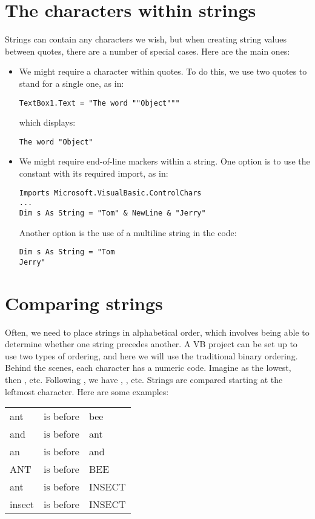	\section{The characters within strings}
		Strings can contain any characters we wish, but when creating string values between quotes, there are a number of special cases. Here are the main ones:
		\begin{itemize}
			\item We might require a  character within quotes. To do this, we use two quotes to stand for a single one, as in:
				\begin{lstlisting}
TextBox1.Text = "The word ""Object"""
				\end{lstlisting}
				which displays:
				\begin{lstlisting}
The word "Object"
				\end{lstlisting}
			\item We might require end-of-line markers within a string. One option is to use the constant  with its required import, as in:
				\begin{lstlisting}
Imports Microsoft.VisualBasic.ControlChars
...
Dim s As String = "Tom" & NewLine & "Jerry"
				\end{lstlisting}
				Another option is the use of a multiline string in the code:
				\begin{lstlisting}
Dim s As String = "Tom
Jerry"
				\end{lstlisting}
		\end{itemize}



	\section{Comparing strings}
		Often, we need to place strings in alphabetical order, which involves being able to determine whether one string precedes another. A VB project can be set up to use two types of ordering, and here we will use the traditional binary ordering. Behind the scenes, each character has a numeric code. Imagine  as the lowest, then , etc. Following , we have , , etc. Strings are compared starting at the leftmost character. Here are some examples:
		
		\begin{center}
			\begin{tabular}{>{\collectcell\keyword}l<{\endcollectcell} l >{\collectcell\keyword}l<{\endcollectcell} }
			ant &is before & bee \\
			and& is before& ant \\
			an &is before& and \\
			ANT& is before& BEE \\
			ant& is before & INSECT \\
			insect& is before & INSECT
			\end{tabular}
		\end{center}

